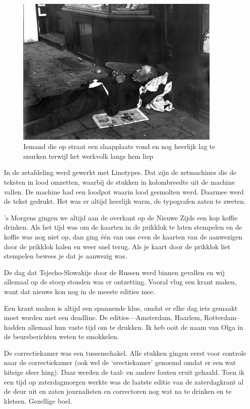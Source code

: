 \documentclass[12pt,twoside, openright]{memoir}
\begin{document}
\begin{figure}
\centering
\includegraphics[width=0.9\textwidth]{img/23dslaap.png}
\caption*{\footnotesize Iemand die op straat een slaapplaats vond en nog heerlijk lag te snurken terwijl het werkvolk langs hem liep}
\end{figure}

In de zetafdeling werd gewerkt met Linotypes. Dat zijn de zetmachines die de teksten in lood omzetten, waarbij de stukken in kolombreedte uit de machine vallen. De machine had een loodpot waarin lood gesmolten werd. Daarmee werd de tekst gedrukt. Het was er altijd heerlijk warm, de typografen zaten te zweten.

's Morgens gingen we altijd aan de overkant op de Nieuwe Zijds een kop koffie drinken. Als het tijd was om de kaarten in de prikklok te laten stempelen en de koffie was nog niet op, dan ging één van ons even de kaarten van de aanwezigen door de prikklok halen en weer snel terug. Als je kaart door de prikklok liet stempelen bewees je dat je aanwezig was.

De dag dat Tsjecho-Slowakije door de Russen werd binnen gevallen en wij allemaal op de stoep stonden was er ontzetting. Vooral vlug een krant maken, want dat nieuws kon nog in de meeste edities mee. 

Een krant maken is altijd een spannende klus, omdat er elke dag iets gemaakt moet worden met een deadline. De edities---Amsterdam, Haarlem, Rotterdam--hadden allemaal hun vaste tijd om te drukken. Ik heb ooit de naam van Olga in de beursberichten weten te smokkelen. 

De correctiekamer was een tussenschakel. Alle stukken gingen eerst voor controle naar de correctiekamer (ook wel de `erectiekamer' genoemd omdat er een wat hitsige sfeer hing). Daar werden de taal- en andere fouten eruit gehaald. Toen ik een tijd op zaterdagmorgen werkte was de laatste editie van de zaterdagkrant al de deur uit en zaten journalisten en correctoren nog wat na te drinken en te kletsen. Gezellige boel. 
\end{document}
